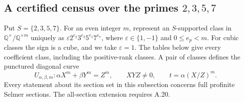 \subsection{A certified census over the primes $2,3,5,7$}

Put $S=\{2,3,5,7\}$. For an even integer $m$, represent an $S$-supported
class in $\mathbb Q^\times/\mathbb Q^{\times m}$ uniquely as
$\varepsilon2^{e_2}3^{e_3}5^{e_5}7^{e_7}$, where
$\varepsilon\in\{1,-1\}$ and $0\leq e_p<m$. For cubic classes the sign
is a cube, and we take $\varepsilon=1$. The tables below give every
coefficient class, including the positive-rank classes. A pair of classes
defines the punctured diagonal curve
\[
 U_{\alpha,\beta,m}:
 \alpha X^m+\beta Y^m=Z^m,\qquad XYZ\ne0,
 \qquad t=\alpha(X/Z)^m.
\]
Every statement about its section set in this subsection concerns full
profinite Selmer sections. The all-section extension requires A.20.

